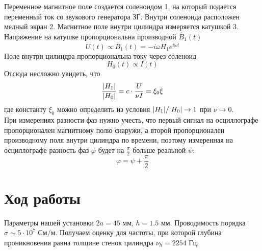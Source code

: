 \documentclass[a4paper, 12pt]{article}
\begin{document}
	Переменное магнитное поле создается соленоидом 1, на который подается переменный ток со звукового генератора ЗГ. Внутри соленоида расположен медный экран 2. Магнитное поле внутри цилиндра измеряется катушкой 3. Напряжение на катушке пропорциональна производной $\dot{B_1}(t)$
	\begin{equation*}
		U(t) \propto \dot{B_1}(t) = -i\omega H_1 e^{i\omega t}
	\end{equation*}
	Поле внутри цилиндра пропорциональна току через соленоид
	\begin{equation*}
		H_0(t) \propto I(t)
	\end{equation*}
	Отсюда несложно увидеть, что
	\begin{equation}
		\frac{\abs{H_1}}{\abs{H_0}} = c \cdot \frac{U}{\nu I} = \xi_0 \xi
		\label{eq:otnoshenie_amplitud}
	\end{equation}
	где константу  $\xi_0$ можно определить из условия $\abs{H_1}/\abs{H_0} \rightarrow 1$ при
	$\nu \rightarrow 0$.\\
	
	При измерениях разности фаз нужно учесть, что первый сигнал на осциллографе
	пропорционален магнитному полю снаружи, а второй пропорционален производному
	поля внутри цилиндра по времени, поэтому измеренная на осциллографе разность фаз $\varphi$ будет на $\frac{\pi}{2}$ больше реальной $\psi$:
	\[\varphi = \psi + \frac{\pi}{2}\]

	\section*{Ход работы}
	
	Параметры нашей установки $2a = 45$ мм, $h=1.5$ мм. Проводимость порядка
	$\sigma \sim 5\cdot 10^7$ См/м. Получаем оценку для частоты, при которой
	глубина проникновения равна толщине стенок цилиндра $\nu_h = 2254$ Гц.
	
\end{document}
